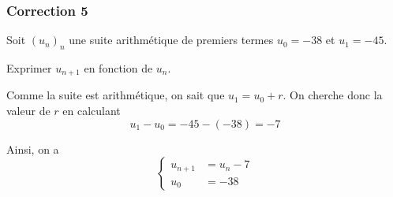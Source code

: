 \documentclass[15pt, mathserif]{beamer}
\begin{document}
\begin{frame}
\vspace{-10mm}
	\frametitle{Correction 5}
Soit $(u_n)_n$ une suite arithmétique de premiers termes $u_0=-38$ et $u_1=-45$. 
 
 Exprimer $u_{n+1}$ en fonction de $u_n$. 
 
 \vspace*{1cm} 
 
 Comme la suite est arithmétique, on sait que $u_1=u_0+r$. On cherche donc la valeur de $r$ en calculant $$u_1-u_0=-45-\left(-38\right)=-7$$ 
 
 Ainsi, on a $$ \left\{ 
 \begin{array}{ll} 
 u_{n+1} &= u_n -7 \\ 
 u_0 & = -38 
 \end{array} 
 \right. $$ 
 \end{frame}
\end{document}

